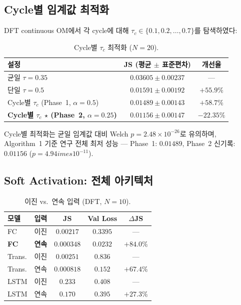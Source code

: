 \documentclass[11pt,a4paper]{article}
\begin{document}
\subsection{Cycle별 임계값 최적화}
\label{subsec:percycle}

DFT continuous OM에서 각 cycle에 대해
$\tau_c \in \{0.1, 0.2, \ldots, 0.7\}$를 탐색하였다:

\begin{table}[H]
\centering
\caption{Cycle별 $\tau_c$ 최적화 ($N=20$).}
\label{tab:percycle}
\begin{tabular}{lcc}
\toprule
설정 & JS (평균 $\pm$ 표준편차) & 개선율 \\
\midrule
균일 $\tau = 0.35$ & $0.03605 \pm 0.00237$ & --- \\
단일 $\tau = 0.5$ & $0.01591 \pm 0.00192$ & $+55.9\%$ \\
Cycle별 $\tau_c$ (Phase~1, $\alpha=0.5$) & $0.01489 \pm 0.00143$ & $+58.7\%$ \\
\textbf{Cycle별 $\tau_c$ $\star$ (Phase~2, $\alpha=0.25$)} & $\mathbf{0.01156 \pm 0.00147}$ & $\mathbf{-22.35\%}$ \\
\bottomrule
\end{tabular}
\end{table}

Cycle별 최적화는 균일 임계값 대비 Welch
$p = 2.48 \times 10^{-26}$로 유의하며, Algorithm~1 기준 연구 전체
최저 성능 — Phase~1: $0.01489$, Phase~2 신기록: $\mathbf{0.01156}$ ($p=4.94	imes10^{-11}$).

\subsection{Soft Activation: 전체 아키텍처}
\label{subsec:soft}

\begin{table}[H]
\centering
\caption{이진 vs.\ 연속 입력 (DFT, $N=10$).}
\label{tab:soft}
\begin{tabular}{llccc}
\toprule
모델 & 입력 & JS & Val Loss & $\Delta$JS \\
\midrule
FC   & 이진 & $0.00217$ & $0.3395$ & --- \\
\textbf{FC} & \textbf{연속} & $\mathbf{0.000348}$ & $\mathbf{0.0232}$ & $\mathbf{+84.0\%}$ \\
Trans. & 이진 & $0.00251$ & $0.836$ & --- \\
Trans. & 연속 & $0.000818$ & $0.152$ & $+67.4\%$ \\
LSTM & 이진 & $0.233$ & $0.408$ & --- \\
LSTM & 연속 & $0.170$ & $0.395$ & $+27.3\%$ \\
\bottomrule
\end{tabular}
\end{table}
\end{document}
